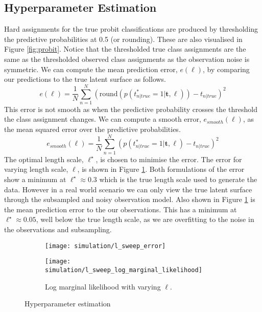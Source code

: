 \documentclass[11pt]{article}
\begin{document}
\subsection{Hyperparameter Estimation}
\label{sec:hyperparameter_estimation}
Hard assignments for the true probit classifications are produced by thresholding the predictive probabilities at 0.5 (or rounding). These are also visualised in Figure \ref{fig:probit}. Notice that the thresholded true class assignments are the same as the thresholded observed class assignments as the observation noise is symmetric. We can compute the mean prediction error, $e(\ell)$, by comparing our predictions to the true latent surface as follows.
\begin{equation}
    e(\ell) = \frac{1}{N}\sum_{n=1}^N (\text{round}(p(t_{n|true}^*=1|\boldsymbol{t}, \ell)) - t_{n|true})^2
\end{equation}
This error is not smooth as when the predictive probability crosses the threshold the class assignment changes. We can compute a smooth error, $e_{smooth}(\ell)$, as the mean squared error over the predictive probabilities.
\begin{equation}
    e_{smooth}(\ell) = \frac{1}{N}\sum_{n=1}^N (p(t_{n|true}^*=1|\boldsymbol{t}, \ell) - t_{n|true})^2
\end{equation}
The optimal length scale, $\ell^{\star}$, is chosen to minimise the error. The error for varying length scale, $\ell$, is shown in Figure \ref{fig:prediction_error}. Both formulations of the error show a minimum at $\ell^{\star} \approx 0.3$ which is the true length scale used to generate the data. However in a real world scenario we can only view the true latent surface through the subsampled and noisy observation model. Also shown in Figure \ref{fig:prediction_error} is the mean prediction error to the our observations. This has a minimum at $\ell^{\star} \approx 0.05$, well below the true length scale, as we are overfitting to the noise in the observations and subsampling.
\begin{figure}
    \centering
    \begin{subfigure}{0.45\textwidth}        
        \texttt{[image: simulation/l\_sweep\_error]}
        \label{fig:prediction_error}
    \end{subfigure}
    \begin{subfigure}{0.45\textwidth}        
        \texttt{[image: simulation/l\_sweep\_log\_marginal\_likelihood]}
        \caption{Log marginal likelihood with varying $\ell$.}
        \label{fig:marginal_likelihood}
    \end{subfigure}
    \caption{Hyperparameter estimation}
\end{figure}
\end{document}
